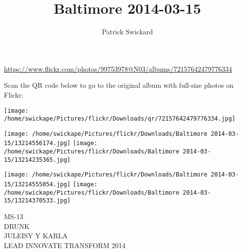 \documentclass[10pt,letterpaper]{article}
\title{Baltimore 2014-03-15}
\author{Patrick Swickard}
\date{}
\begin{document}
\maketitle

\url{https://www.flickr.com/photos/99753978@N03/albums/72157642479776334}

Scan the QR code below to go to the original album with full-size photos on Flickr:

\texttt{[image: /home/swickape/Pictures/flickr/Downloads/qr/72157642479776334.jpg]}
\pagebreak

\texttt{[image: /home/swickape/Pictures/flickr/Downloads/Baltimore 2014-03-15/13214556174.jpg]}
\texttt{[image: /home/swickape/Pictures/flickr/Downloads/Baltimore 2014-03-15/13214235365.jpg]}

\texttt{[image: /home/swickape/Pictures/flickr/Downloads/Baltimore 2014-03-15/13214555054.jpg]}
\texttt{[image: /home/swickape/Pictures/flickr/Downloads/Baltimore 2014-03-15/13214370533.jpg]}

MS{-}13\\
DRUNK\\
JULEISY Y KARLA\\
LEAD INNOVATE TRANSFORM 2014
\pagebreak
\end{document}
